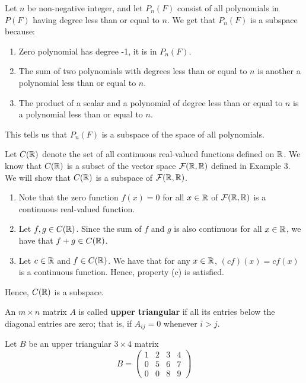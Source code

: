 \begin{eg}
    Let \( n  \) be non-negative integer, and let \( P_{n}(F) \) consist of all polynomials in \( P(F) \) having degree less than or equal to \( n \). We get that \( P_{n}(F) \) is a subspace because:
    \begin{enumerate}
        \item Zero polynomial has degree -1, it is in \( P_{n}(F) \). 
        \item The sum of two polynomials with degrees less than or equal to \( n  \) is another a polynomial less than or equal to \( n  \).
        \item The product of a scalar and a polynomial of degree less than or equal to \( n  \) is a polynomial less than or equal to \( n  \).
    \end{enumerate}
    This tells us that \( P_{n}(F) \) is a subspace of the space of all polynomials.
\end{eg}

\begin{eg}
    Let \( C(\mathbb{R} ) \) denote the set of all continuous real-valued functions defined on \( \mathbb{R}  \). We know that \( C(\mathbb{R} ) \) is a subset of the vector space \( \mathcal{F}(\mathbb{R} , \mathbb{R} ) \) defined in Example 3.  We will show that \( C(\mathbb{R} ) \) is a subspace of \( \mathcal{F}(\mathbb{R} , \mathbb{R} ) \).
    \begin{enumerate}
        \item Note that the zero function \( f(x) = 0    \) for all \( x \in \mathbb{R}  \) of \( \mathcal{F}(\mathbb{R} ,\mathbb{R} ) \) is a continuous real-valued function. 
        \item Let \( f,g \in C(\mathbb{R} )\). Since the sum of \( f   \)  and \( g  \) is also continuous for all \( x \in \mathbb{R}  \), we have that \( f + g  \in C(\mathbb{R} ) \).
        \item Let \( c \in \mathbb{R}  \) and \( f \in C(\mathbb{R} ) \). We have that for any \( x \in \mathbb{R}   \), \( (cf)(x) = cf(x)    \) is a continuous function. Hence, property (c) is satisfied.
    \end{enumerate}
    Hence, \( C(\mathbb{R} ) \) is a subspace.
\end{eg}

\begin{definition}
    An \( m \times n  \) matrix \( A  \) is called \textbf{upper triangular} if all its entries below the diagonal entries are zero; that is, if \( A_{ij} = 0  \) whenever \( i > j  \). 
\end{definition}

\begin{eg}
    Let \( B  \) be an upper triangular \( 3 \times 4  \) matrix 
    \[  B = \begin{pmatrix}
        1 & 2 & 3 & 4 \\
        0 & 5 & 6 & 7 \\
        0 & 0 & 8 & 9
    \end{pmatrix} \]
\end{eg}

